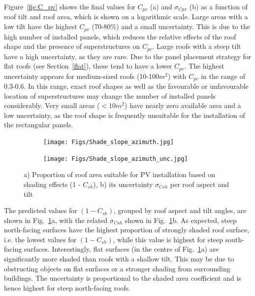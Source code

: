 Figure~\ref{fig:C_pv} shows the final values for $C_{pv}$ (a) and $\sigma_{Cpv}$ (b) as a function of roof tilt and roof area, which is shown on a logarithmic scale. 
Large areas with a low tilt have the highest $C_{pv}$ (70-80\%) and a small uncertainty.
This is due to the high number of installed panels, which reduces the relative effects of the roof shape and the presence of superstructures on $C_{pv}$. Large roofs with a steep tilt have a high uncertainty, as they are rare.
Due to the panel placement strategy for flat roofs (see Section~\ref{flat}), these tend to have a lower $C_{pv}$. 
The highest uncertainty appears for medium-sized roofs (10-100$m^2$) with $C_{pv}$ in the range of 0.3-0.6. In this range, exact roof shapes as well as the favourable or unfavourable location of superstructures may change the number of installed panels considerably.
Very small areas ($< 10m^2$) have nearly zero available area and a low uncertainty, as the roof shape is frequently unsuitable for the installation of the rectangular panels.

\begin{figure}[tb]
\centering
\begin{subfigure}{.49\textwidth}
  \centering
  \texttt{[image: Figs/Shade\_slope\_azimuth.jpg]}
  \subcaption{}
\end{subfigure}
\begin{subfigure}{.49\textwidth}
  \centering
  \texttt{[image: Figs/Shade\_slope\_azimuth\_unc.jpg]}  
  \subcaption{}
\end{subfigure}
\caption{a) Proportion of roof area suitable for PV installation based on shading effects (1 - $C_{sh}$), b) its uncertainty $\sigma_{Csh}$ per roof aspect and tilt}
\label{fig:Csh}
\end{figure}

The predicted values for $(1-C_{sh})$, grouped by roof aspect and tilt angles, are shown in Fig.~\ref{fig:Csh}a, with the related $\sigma_{Csh}$ shown in Fig.~\ref{fig:Csh}b. 
As expected, steep north-facing surfaces have the highest proportion of strongly shaded roof surface, i.e. the lowest values for $(1-C_{sh})$, while this value is highest for steep south-facing surfaces. 
Interestingly, flat surfaces (in the centre of  Fig.~\ref{fig:Csh}a) are significantly more shaded than roofs with a shallow tilt. This may be due to obstructing objects on flat surfaces or a stronger shading from surrounding buildings. 
The uncertainty is proportional to the shaded area coefficient and is hence highest for steep north-facing roofs. 

